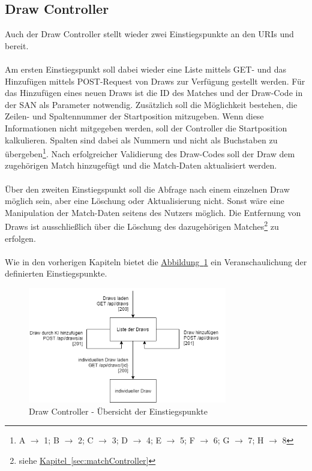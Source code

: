\subsection{Draw Controller}\label{sec:drawController}
Auch der Draw Controller stellt wieder zwei Einstiegspunkte an den \glspl{URI}  und  bereit. \\
\\
Am ersten Einstiegspunkt soll dabei wieder eine Liste mittels GET- und das Hinzufügen mittels POST-Request von Draws zur Verfügung gestellt werden. Für das Hinzufügen eines neuen Draws ist die ID des Matches und der Draw-Code in der \gls{SAN} als Parameter notwendig. Zusätzlich soll die Möglichkeit bestehen, die Zeilen- und Spaltennummer der Startposition mitzugeben. Wenn diese Informationen nicht mitgegeben werden, soll der Controller die Startposition kalkulieren. Spalten sind dabei als Nummern und nicht als Buchstaben zu übergeben\footnote{A $\rightarrow$ 1; B $\rightarrow$ 2; C $\rightarrow$ 3; D $\rightarrow$ 4; E $\rightarrow$ 5; F $\rightarrow$ 6; G $\rightarrow$ 7; H $\rightarrow$ 8}. Nach erfolgreicher Validierung des Draw-Codes soll der Draw dem zugehörigen Match hinzugefügt und die Match-Daten aktualisiert werden.\\
\\
Über den zweiten Einstiegspunkt soll die Abfrage nach einem einzelnen Draw möglich sein, aber eine Löschung oder Aktualisierung nicht. Sonst wäre eine Manipulation der Match-Daten seitens des Nutzers möglich. Die Entfernung von Draws ist ausschließlich über die Löschung des dazugehörigen Matches\footnote{siehe \hyperref[sec:matchController]{Kapitel~\ref{sec:matchController}}} zu erfolgen.\\
\\
Wie in den vorherigen Kapiteln bietet die \hyperref[fig:drawController]{Abbildung~\ref{fig:drawController}} ein Veranschaulichung der definierten Einstiegspunkte.\\
\begin{figure}[htb]
	\includegraphics[width=0.7735\textwidth]{images/draw-controller.png}
	\caption{Draw Controller - Übersicht der Einstiegspunkte}
	\label{fig:drawController}
\end{figure}


